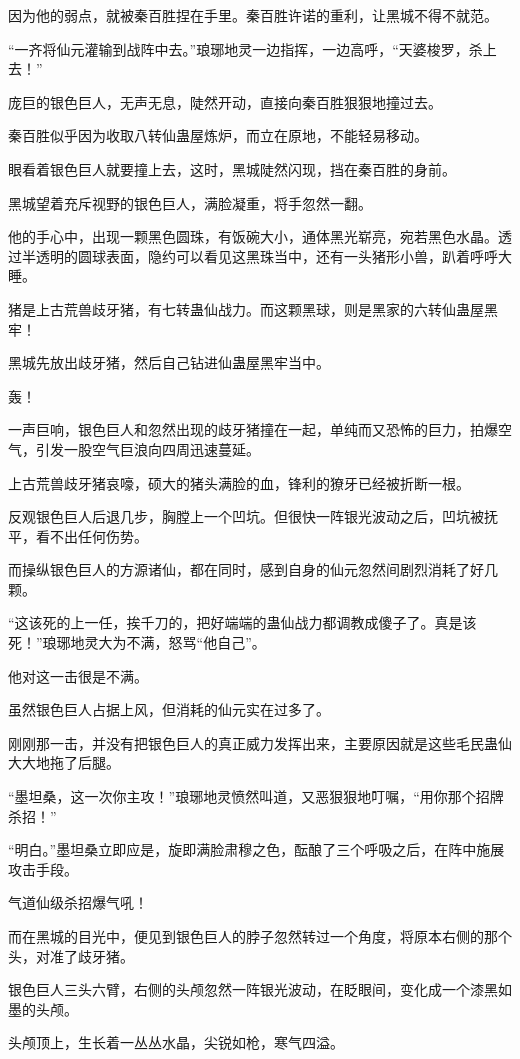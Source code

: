 \begin{this_body}
因为他的弱点，就被秦百胜捏在手里。秦百胜许诺的重利，让黑城不得不就范。

“一齐将仙元灌输到战阵中去。”琅琊地灵一边指挥，一边高呼，“天婆梭罗，杀上去！”

庞巨的银色巨人，无声无息，陡然开动，直接向秦百胜狠狠地撞过去。

秦百胜似乎因为收取八转仙蛊屋炼炉，而立在原地，不能轻易移动。

眼看着银色巨人就要撞上去，这时，黑城陡然闪现，挡在秦百胜的身前。

黑城望着充斥视野的银色巨人，满脸凝重，将手忽然一翻。

他的手心中，出现一颗黑色圆珠，有饭碗大小，通体黑光崭亮，宛若黑色水晶。透过半透明的圆球表面，隐约可以看见这黑珠当中，还有一头猪形小兽，趴着呼呼大睡。

猪是上古荒兽歧牙猪，有七转蛊仙战力。而这颗黑球，则是黑家的六转仙蛊屋黑牢！

黑城先放出歧牙猪，然后自己钻进仙蛊屋黑牢当中。

轰！

一声巨响，银色巨人和忽然出现的歧牙猪撞在一起，单纯而又恐怖的巨力，拍爆空气，引发一股空气巨浪向四周迅速蔓延。

上古荒兽歧牙猪哀嚎，硕大的猪头满脸的血，锋利的獠牙已经被折断一根。

反观银色巨人后退几步，胸膛上一个凹坑。但很快一阵银光波动之后，凹坑被抚平，看不出任何伤势。

而操纵银色巨人的方源诸仙，都在同时，感到自身的仙元忽然间剧烈消耗了好几颗。

“这该死的上一任，挨千刀的，把好端端的蛊仙战力都调教成傻子了。真是该死！”琅琊地灵大为不满，怒骂“他自己”。

他对这一击很是不满。

虽然银色巨人占据上风，但消耗的仙元实在过多了。

刚刚那一击，并没有把银色巨人的真正威力发挥出来，主要原因就是这些毛民蛊仙大大地拖了后腿。

“墨坦桑，这一次你主攻！”琅琊地灵愤然叫道，又恶狠狠地叮嘱，“用你那个招牌杀招！”

“明白。”墨坦桑立即应是，旋即满脸肃穆之色，酝酿了三个呼吸之后，在阵中施展攻击手段。

气道仙级杀招爆气吼！

而在黑城的目光中，便见到银色巨人的脖子忽然转过一个角度，将原本右侧的那个头，对准了歧牙猪。

银色巨人三头六臂，右侧的头颅忽然一阵银光波动，在眨眼间，变化成一个漆黑如墨的头颅。

头颅顶上，生长着一丛丛水晶，尖锐如枪，寒气四溢。


\end{this_body}
